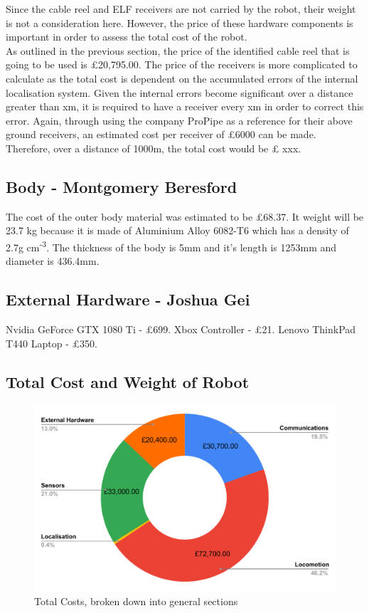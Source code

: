 \documentclass[11pt]{article}		%
\newlength{\imageheight}	 %
\begin{document}
	        Since the cable reel and ELF receivers are not carried by the robot, their weight is not a consideration here. However, the price of these hardware components is important in order to assess the total cost of the robot. \\
		    \hspace*{3ex}As outlined in the previous section, the price of the identified cable reel that is going to be used is £20,795.00. The price of the receivers is more complicated to calculate as the total cost is dependent on the accumulated errors of the internal localisation system. Given the internal errors become significant over a distance greater than xm, it is required to have a receiver every xm in order to correct this error. Again, through using the company ProPipe as a reference for their above ground receivers, an estimated cost per receiver of £6000 can be made. Therefore, over a distance of 1000m, the total cost would be £ xxx. 
		    
		    
	    \subsection[Body]{Body - Montgomery Beresford}
		    
		    The cost of the outer body material was estimated to be £68.37. It weight will be 23.7 kg because it is made of Aluminium Alloy 6082-T6 which has a density of 2.7g cm\textsuperscript{-3}. The thickness of the body is 5mm and it's length is 1253mm and diameter is 436.4mm.



		\subsection[External Hardware]{External Hardware - Joshua Gei}
			Nvidia GeForce GTX 1080 Ti - £699. Xbox Controller - £21. Lenovo ThinkPad T440 Laptop - £350.
		
		\subsection{Total Cost and Weight of Robot}
		\begin{figure}[H]
		    \centering
		    \includegraphics[height=\imageheight]{costBreakdown}
		    \caption{Total Costs, broken down into general sections}
		    \label{costBreakdown}
		\end{figure}
\end{document}
